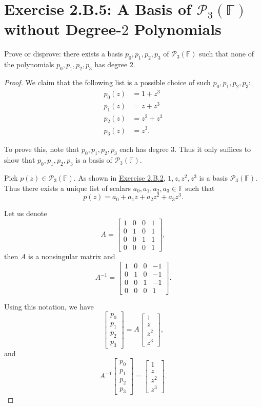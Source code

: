 \section{Exercise 2.B.5: A Basis of $\mathcal{P}_3(\mathbb{F})$ without Degree-$2$ Polynomials}
Prove or disprove: there exists a basis $p_0,p_1,p_2,p_3$ of $\mathcal{P}_3(\mathbb{F})$ such that none of the polynomials $p_0,p_1,p_2,p_3$ has degree $2$.
\begin{proof}
We claim that the following list is a possible choice of such $p_0,p_1,p_2,p_3$:
\begin{equation*}
\begin{split}
p_0(z)&=1+z^3\\
p_1(z)&=z+z^3\\
p_2(z)&=z^2+z^3\\
p_3(z)&=z^3.
\end{split}
\end{equation*}

To prove this, note that $p_0,p_1,p_2,p_3$ each has degree $3$. Thus it only suffices to show that $p_0,p_1,p_2,p_3$ is a basis of $\mathcal{P}_3(\mathbb{F})$.

Pick $p(z)\in \mathcal{P}_3(\mathbb{F})$. As shown in \hyperref[Exercise 2.B.2]{Exercise 2.B.2}, $1,z,z^2,z^3$ is a basis $\mathcal{P}_3(\mathbb{F})$. Thus there exists a unique list of scalars $a_0,a_1,a_2,a_3\in\mathbb{F}$ such that\[
p(z)=a_0+a_1z+a_2z^2+a_3z^3.
\]

Let us denote \[
A=\begin{bmatrix}
1&0&0&1\\
0&1&0&1\\
0&0&1&1\\
0&0&0&1
\end{bmatrix},
\]then $A$ is a nonsingular matrix and\[
A^{-1}=\begin{bmatrix}
1&0&0&-1\\
0&1&0&-1\\
0&0&1&-1\\
0&0&0&1
\end{bmatrix}.
\]

Using this notation, we have\[
\begin{bmatrix}
p_0\\
p_1\\
p_2\\
p_3
\end{bmatrix}
=
A\begin{bmatrix}
1\\
z\\
z^2\\
z^3
\end{bmatrix},
\] and \[
A^{-1}
\begin{bmatrix}
p_0\\
p_1\\
p_2\\
p_3
\end{bmatrix}
=
\begin{bmatrix}
1\\
z\\
z^2\\
z^3
\end{bmatrix}.
\]


\end{proof}

